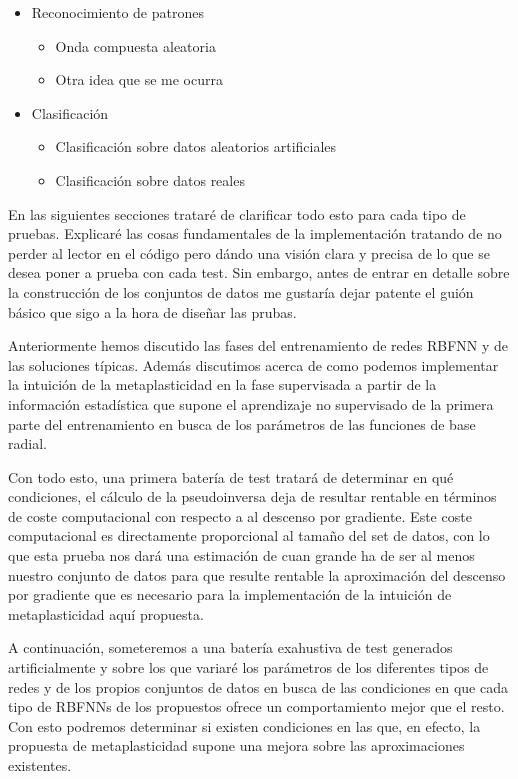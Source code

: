 \documentclass[10pt,a4paper]{report}
\begin{document}
\begin{itemize}
	\item Reconocimiento de patrones
	\begin{itemize}
		\item Onda compuesta aleatoria
		\item Otra idea que se me ocurra
	\end{itemize}
	\item Clasificación
	\begin{itemize}
		\item Clasificación sobre datos aleatorios artificiales
		\item Clasificación sobre datos reales
	\end{itemize}
\end{itemize} 
En las siguientes secciones trataré de clarificar todo esto para cada tipo de pruebas. Explicaré las cosas fundamentales de la implementación tratando de no perder al lector en el código pero dándo una visión clara y precisa de lo que se desea poner a prueba con cada test. Sin embargo, antes de entrar en detalle sobre la construcción de los conjuntos de datos me gustaría dejar patente el guión básico que sigo a la hora de diseñar las prubas.

Anteriormente hemos discutido las fases del entrenamiento de redes RBFNN y de las soluciones típicas. Además discutimos acerca de como podemos implementar la intuición de la metaplasticidad en la fase supervisada a partir de la información estadística que supone el aprendizaje no supervisado de la primera parte del entrenamiento en busca de los parámetros de las funciones de base radial. 

Con todo esto, una primera batería de test tratará de determinar en qué condiciones, el cálculo de la pseudoinversa deja de resultar rentable en términos de coste computacional con respecto a al descenso por gradiente. Este coste computacional es directamente proporcional al tamaño del set de datos, con lo que esta prueba nos dará una estimación de cuan grande ha de ser al menos nuestro conjunto de datos para que resulte rentable la aproximación del descenso por gradiente que es necesario para la implementación de la intuición de metaplasticidad aquí propuesta.

A continuación, someteremos a una batería exahustiva de test generados artificialmente y sobre los que variaré los parámetros de los diferentes tipos de redes y de los propios conjuntos de datos en busca de las condiciones en que cada tipo de RBFNNs de los propuestos ofrece un comportamiento mejor que el resto. Con esto podremos determinar si existen condiciones en las que, en efecto, la propuesta de metaplasticidad supone una mejora sobre las aproximaciones existentes.
\end{document}
